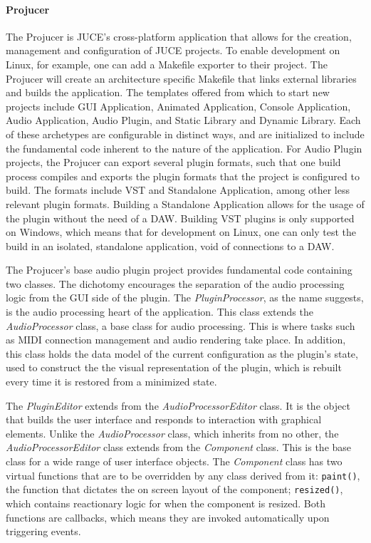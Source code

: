 \documentclass[12pt, a4paper, hidelinks]{article}
\begin{document}
	\paragraph{Projucer\\}
	The Projucer is JUCE's cross-platform application that allows for the creation, management and configuration of JUCE projects. To enable development on Linux, for example, one can add a Makefile exporter to their project. The Projucer will create an architecture specific Makefile that links external libraries and builds the application. The templates offered from which to start new projects include GUI Application, Animated Application, Console Application, Audio Application, Audio Plugin, and Static Library and Dynamic Library. Each of these archetypes are configurable in distinct ways, and are initialized to include the fundamental code inherent to the nature of the application. For Audio Plugin projects, the Projucer can export several plugin formats, such that one build process compiles and exports the plugin formats that the project is configured to build. The formats include VST and Standalone Application, among other less relevant plugin formats. Building a Standalone Application allows for the usage of the plugin without the need of a DAW. Building VST plugins is only supported on Windows, which means that for development on Linux, one can only test the build in an isolated, standalone application, void of connections to a DAW. \par
	
	The Projucer's base audio plugin project provides fundamental code containing two classes. The dichotomy encourages the separation of the audio processing logic from the GUI side of the plugin. The \textit{PluginProcessor}, as the name suggests, is the audio processing heart of the application. This class extends the \textit{AudioProcessor} class, a base class for audio processing. This is where tasks such as MIDI connection management and audio rendering take place. In addition, this class holds the data model of the current configuration as the plugin's state, used to construct the the visual representation of the plugin, which is rebuilt every time it is restored from a minimized state.\par
	The \textit{PluginEditor} extends from the \textit{AudioProcessorEditor} class. It is the object that builds the user interface and responds to interaction with graphical elements. Unlike the \textit{AudioProcessor} class, which inherits from no other, the \textit{AudioProcessorEditor} class extends from the \textit{Component} class. This is the base class for a wide range of user interface objects. The \textit{Component} class has two virtual functions that are to be overridden by any class derived from it: \texttt{paint()}, the function that dictates the on screen layout of the component; \texttt{resized()}, which contains reactionary logic for when the component is resized. Both functions are callbacks, which means they are invoked automatically upon triggering events.\par 
	
\end{document}
